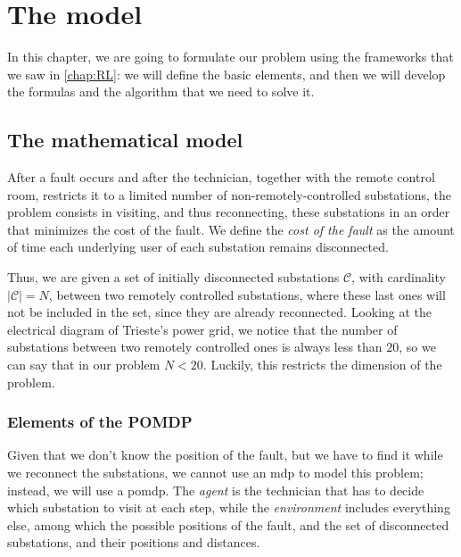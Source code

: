 \chapter{The model} %
\label{chap:model}


In this chapter, we are going to formulate our problem using the frameworks that we saw in \autoref{chap:RL}: we will define the basic elements, and then we will develop the formulas and the algorithm that we need to solve it.


\section{The mathematical model}

After a fault occurs and after the technician, together with the remote control room, restricts it to a limited number of non-remotely-controlled substations, the problem consists in visiting, and thus reconnecting, these substations in an order that minimizes the cost of the fault. We define the \emph{cost of the fault} as the amount of time each underlying user of each substation remains disconnected.

Thus, we are given a set of initially disconnected substations $\mathcal C$, with cardinality $|\mathcal C| = N$, between two remotely controlled substations, where these last ones will not be included in the set, since they are already reconnected. Looking at the electrical diagram of Trieste's power grid, we notice that the number of substations between two remotely controlled ones is always less than $20$, so we can say that in our problem $N < 20$. Luckily, this restricts the dimension of the problem.

\subsection{Elements of the POMDP}

Given that we don't know the position of the fault, but we have to find it while we reconnect the substations, we cannot use an \acrshort{mdp} to model this problem; instead, we will use a \acrshort{pomdp}. The \emph{agent} is the technician that has to decide which substation to visit at each step, while the \emph{environment} includes everything else, among which the possible positions of the fault, and the set of disconnected substations, and their positions and distances.

